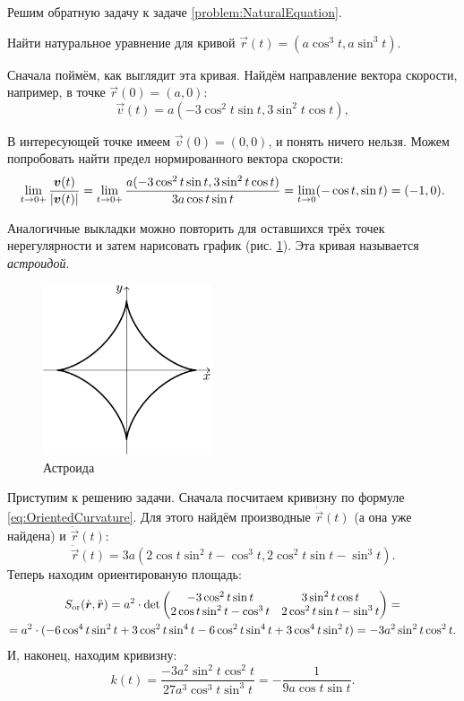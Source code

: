 Решим обратную задачу к задаче \ref{problem:NaturalEquation}.

\begin{problem}
	Найти натуральное уравнение для кривой $\vec{r}(t) = (a\cos^3t, a\sin^3t)$.
\end{problem}

\begin{solution}
	Сначала поймём, как выглядит эта кривая. Найдём направление вектора скорости, например, в точке $\vec{r}(0) = (a, 0)$:
	\[
		\vec{v}(t) = a(-3\cos^2t\sin t, 3\sin^2t\cos t),
	\]

	В интересующей точке имеем $\vec{v}(0) = (0, 0)$, и понять ничего нельзя. Можем попробовать найти предел нормированного вектора скорости:
	\[
		\lim_{t \to 0+}\frac{\boldsymbol{v}(t)}{\left\lvert\boldsymbol{v}(t)\right\rvert} = \lim_{t \to 0+}\frac{a(-3\cos^2t\sin t, 3\sin^2t\cos t)}{3a\cos t\sin t} = \lim_{t \to 0}(-\cos t, \sin t) = (-1, 0).
	\]

	Аналогичные выкладки можно повторить для оставшихся трёх точек нерегулярности и затем нарисовать график (рис. \ref{fig:Astroid}). Эта кривая называется \textit{астроидой}.

	\begin{figure}[h]
		\centering
		\includegraphics[width=5cm]{./img/Astroid.pdf}
		\caption{Астроида}
		\label{fig:Astroid}
	\end{figure}

	Приступим к решению задачи. Сначала посчитаем кривизну по формуле \eqref{eq:OrientedCurvature}. Для этого найдём производные $\dot{\vec{r}}(t)$ (а она уже найдена) и $\ddot{\vec{r}}(t)$:
	\[
		\ddot{\vec{r}}(t) = 3a(2\cos t\sin^2t - \cos^3t, 2\cos^2t\sin t - \sin^3t).
	\]
	Теперь находим ориентированую площадь:
	\begin{multline*}
		S_{\mathrm{or}}(\dot{\boldsymbol{r}}, \ddot{\boldsymbol{r}}) = a^2 \cdot \det
		\begin{pmatrix}
			-3\cos^2t\sin t & 3\sin^2t\cos t\\
			2\cos t\sin^2 t - \cos^3t & 2\cos^2t\sin t - \sin^3t
		\end{pmatrix} = \\ = a^2 \cdot (-6\cos^4t\sin^2t + 3\cos^2t\sin^4t - 6\cos^2t\sin^4t + 3\cos^4t\sin^2t) = -3a^2\sin^2t\cos^2t.
	\end{multline*}
	И, наконец, находим кривизну:
	\[
		k(t) = \frac{-3a^2\sin^2t\cos^2t}{27a^3\cos^3t\sin^3t} = -\frac{1}{9a\cos t\sin t}.
	\]


\end{solution}
